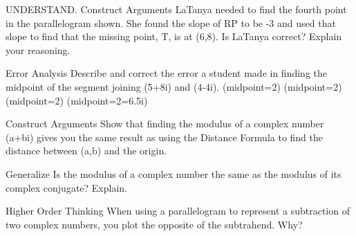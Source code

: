 \documentclass{article}
\newenvironment{practice}[2]{}{}        %
\newcommand{\answer}[1]{}               %
\newcommand{\placeholder}[2]{}          %
\newcommand{\te}[1]{}                   %
\begin{document}
\begin{practice}{12}{2}
UNDERSTAND. Construct Arguments LaTanya needed to find the fourth point in the parallelogram shown. She found the slope of RP to be -3 and used that slope to find that the missing point, T, is at (6,8). Is LaTanya correct? Explain your reasoning.
\placeholder{graph}{Unit complex grid real [-5,10], imaginary [-2,12], black double-arrowed R and i axes, O origin. Real labels -4,-2,2,4,6,8, imaginary 2,4,6,8,10. Red filled P(0,0),R(-3,9),S(5,11), labels P(0,0),R(-3,9),S(5+11i). No connecting segments.}
\answer{No, LaTanya is not correct. The slope of RP is (\frac{-9}3). This reduces to -3, but she needed to count down 9 and right 3 from point S, not down 3 and right 1. The point T should be at (8,2).}
\end{practice}
\begin{practice}{13}{2}
Error Analysis Describe and correct the error a student made in finding the midpoint of the segment joining (5+8i) and (4-4i).
(midpoint=2)
(midpoint=2)
(midpoint=2)
(midpoint=2=6.5i)
\te{Student work appears on a gray curled note with red X.}
\answer{The student added 9 and 4i to get 13i, but 9 and 4i can't be added since they are not like terms.
(midpoint=\frac{(5+8i)+(4-4i)}2)
(midpoint=\frac{(5+4)+(8-4)i}2)
(midpoint=\frac{9+4i}2)
(midpoint=\frac92+\frac{4i}2=4.5+2i)}
\end{practice}
\begin{practice}{14}{3}
Construct Arguments Show that finding the modulus of a complex number (a+bi) gives you the same result as using the Distance Formula to find the distance between (a,b) and the origin.
\answer{Using the distance formula:
(d=\sqrt{(x_2-x_1)^2+(y_2-y_1)^2})
(d=\sqrt{(x_2-0)^2+(y_2-0)^2})
(d=\sqrt{(x_2)^2+(y_2)^2})
Using the modulus formula gives:
(modulus=\sqrt{(a+bi)(a-bi)})
(modulus=\sqrt{a^2+abi-abi-(bi)^2})
(modulus=\sqrt{a^2-b^2i^2})
(modulus=\sqrt{a^2-b^2(-1)})
(modulus=\sqrt{a^2+b^2})
Since (x_2=a) and (y_2=b),
(\sqrt{(x_2)^2+(y_2)^2}=\sqrt{a^2+b^2}).}
\end{practice}
\begin{practice}{15}{2}
Generalize Is the modulus of a complex number the same as the modulus of its complex conjugate? Explain.
\answer{Yes, the modulus of (a+bi) and the modulus of (a-bi) are both (\sqrt{a^2+b^2}).}
\end{practice}
\begin{practice}{16}{2}
Higher Order Thinking When using a parallelogram to represent a subtraction of two complex numbers, you plot the opposite of the subtrahend. Why?
\answer{Using a parallelogram with the given complex numbers models addition only. In order to model subtraction, you have to write the subtraction problem as adding a negative, or the opposite, instead.}
\end{practice}
\end{document}
